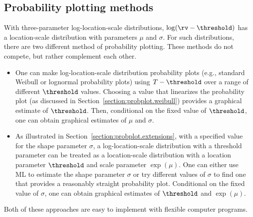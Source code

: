 
\subsection{Probability plotting methods}
With three-parameter log-location-scale distributions,
$\log(\rv-\threshold)$ has a location-scale distribution with
parameters $\mu$ and $\sigma$.  For such distributions, there are two
different method of probability plotting. These methods do not
compete, but rather complement each other.
\begin{itemize}
\item
One can make log-location-scale distribution probability plots
(e.g., standard Weibull or lognormal probability plots) using
$T-\threshold$ over a range of different $\threshold$
values. Choosing a value that linearizes the probability plot (as
discussed in Section~\ref{section:probplot.weibull}) provides a
graphical estimate of $\threshold$.  Then, conditional on the fixed
value of $\threshold$, one can obtain graphical estimates of $\mu$
and $\sigma$.
\item
As illustrated in Section~\ref{section:probplot.extensions}, with a
specified value for the shape parameter $\sigma$, a
log-location-scale distribution with a threshold parameter can be
treated as a location-scale distribution with a location parameter
$\threshold$ and scale parameter $\exp(\mu)$. One can either use ML
to estimate the shape parameter $\sigma$ or try different values of
$\sigma$ to find one that provides a reasonably straight probability
plot.  Conditional on the fixed value of $\sigma$, one can obtain
graphical estimates of $\threshold$ and $\exp(\mu)$.
\end{itemize}
Both of these approaches are easy to implement with flexible computer
programs.


